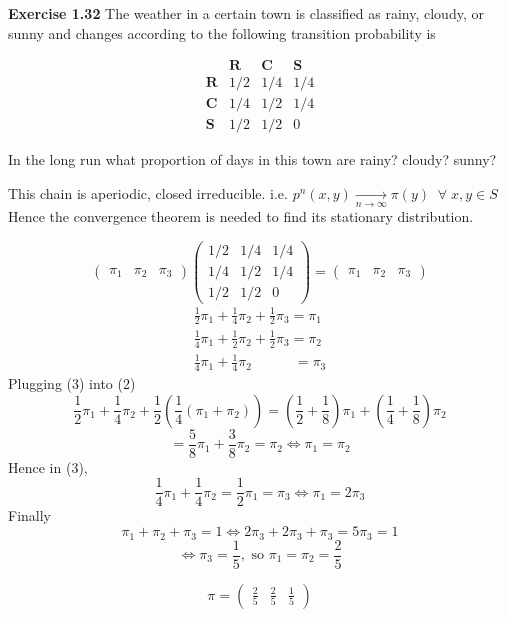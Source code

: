 \documentclass[12pt]{article}
\begin{document}
\newpage
\noindent 
\textbf{Exercise 1.32}
The weather in a certain town is classified as rainy, cloudy, or sunny and
changes according to the following transition probability is

$$
\begin{matrix}
    &\textbf{R}&\textbf{C}&\textbf{S}\\
    \textbf{R}&1/2&1/4&1/4\\
    \textbf{C}&1/4&1/2&1/4\\
    \textbf{S}&1/2&1/2&0
\end{matrix}
$$




In the long run what proportion of days in this town are rainy? cloudy? sunny?\\
\vspace{1.5\baselineskip}

This chain is aperiodic, closed irreducible.  i.e. $p^n(x,y) \xrightarrow[\text{$n\rightarrow \infty$}]{}   \pi(y)\;\;\forall\; x,y\in S $\\
Hence the convergence theorem is needed to find its stationary distribution.

$$
\begin{pmatrix}
    \pi_1&\pi_2&\pi_3 
\end{pmatrix}
\begin{pmatrix}
    1/2&1/4&1/4\\
    1/4&1/2&1/4\\
    1/2&1/2&0
\end{pmatrix}
=
\begin{pmatrix}
    \pi_1&\pi_2&\pi_3 
\end{pmatrix}
$$
\vspace{1.5\baselineskip}
\begin{align}
    \frac{1}{2}\pi_1 + \frac{1}{4}\pi_2 + \frac{1}{2}\pi_3 = \pi_1\\
    \frac{1}{4}\pi_1 + \frac{1}{2}\pi_2 + \frac{1}{2}\pi_3 = \pi_2\\
    \frac{1}{4}\pi_1 + \frac{1}{4}\pi_2 \qquad\quad = \pi_3
\end{align}
Plugging (3) into (2)
$$
\frac{1}{2}\pi_1 + \frac{1}{4}\pi_2 +\frac{1}{2}\left(\frac{1}{4}(\pi_1+\pi_2)
\right)
= \left(\frac{1}{2} + \frac{1}{8} \right)\pi_1 + \left(\frac{1}{4} + \frac{1}{8}\right)\pi_2
$$
$$
= \frac{5}{8}\pi_1 + \frac{3}{8}\pi_2 = \pi_2 
\Leftrightarrow \pi_1 = \pi_2
$$
Hence in (3),
$$
\frac{1}{4}\pi_1 + \frac{1}{4}\pi_2 = \frac{1}{2}\pi_1 = \pi_3
\Leftrightarrow \pi_1 = 2\pi_3
$$
Finally
$$
\pi_1+\pi_2+\pi_3 = 1 \Leftrightarrow 2\pi_3 + 2\pi_3 + \pi_3 = 5\pi_3 = 1
$$
$$
\Leftrightarrow \pi_3 = \frac{1}{5}, \text{ so } \pi_1=\pi_2 = \frac{2}{5}
$$

$$
\pi = 
\begin{pmatrix}
    \frac{2}{5}&\frac{2}{5}&\frac{1}{5}
\end{pmatrix}
$$
\end{document}
